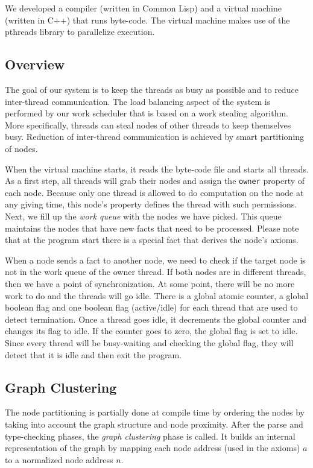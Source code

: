 
We developed a compiler (written in Common Lisp) and a virtual machine (written in C++) that runs
byte-code. The virtual machine makes use of the pthreads library to parallelize execution.

\subsection{Overview}

The goal of our system is to keep the threads as busy as possible and to reduce inter-thread communication.
The load balancing aspect of the system is performed by our work scheduler that is based on a work
stealing algorithm. More specifically, threads can steal nodes of other threads to keep themselves busy.
Reduction of inter-thread communication is achieved by smart partitioning of nodes.

When the virtual machine starts, it reads the byte-code file and starts all threads.
As a first step, all threads will grab their nodes and assign the \texttt{owner} property of each node.
Because only one thread is allowed to do computation on the node at any giving time, this node's property
defines the thread with such permissions.
Next, we fill up the \emph{work queue} with the nodes we have picked. This queue
maintains the nodes that have new facts that need to be processed. Please note that at the program start
there is a special fact that derives the node's axioms.

When a node sends a fact to another node, we need to check if the target node is not in the work queue of the owner thread.
If both nodes are in different threads, then we have a point of synchronization. At some point,
there will be no more work to do and the threads will go idle. There is a global atomic counter, a global
boolean flag and one boolean flag (active/idle) for each thread that are used to detect termination.
Once a thread goes idle, it decrements the global counter and changes its flag to idle. If the counter
goes to zero, the global flag is set to idle. Since every thread will be busy-waiting and checking
the global flag, they will detect that it is idle and then exit the program.

\subsection{Graph Clustering}

The node partitioning is partially done at compile time by ordering the nodes by taking into account
the graph structure and node proximity. After the parse and type-checking phases, the
\emph{graph clustering} phase is called. It builds an internal representation of the graph by
mapping each node address (used in the axioms) $a$ to a normalized node address $n$.

